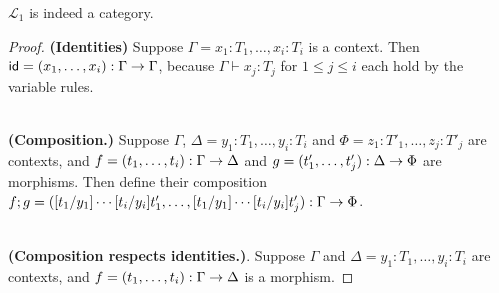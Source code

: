 \begin{lemma}
  \label{lemma:class-stlc}
  $\mathcal{L}_1$ is indeed a category.
\end{lemma}
\begin{proof}
  \textbf{(Identities)} Suppose $\Gamma = x_1:T_1,\ldots,x_i:T_i$ is a
  context.  Then $\mathsf{id} = (x_1,\ldots,x_i) : \Gamma \rightarrow
  \Gamma$, because $\Gamma \vdash x_j : T_j$ for $1 \leq j \leq i$
  each hold by the variable rules.

  \ \\ \textbf{(Composition.)}  Suppose $\Gamma$, $\Delta =
  y_1:T_1,\ldots,y_i:T_i$ and $\Phi = z_1:T'_1,\ldots,z_j:T'_j$ are
  contexts, and $f = (t_1,\ldots,t_i) : \Gamma \rightarrow \Delta$ and $g =
  (t'_1,\ldots,t'_j) : \Delta \rightarrow \Phi$ are morphisms.  Then define
  their composition $f;g =
  ([t_1/y_1]\cdots[t_i/y_i]t'_1,\ldots,[t_1/y_1]\cdots[t_i/y_i]t'_j):
  \Gamma \rightarrow \Phi$.

  \ \\ \textbf{(Composition respects identities.)}. Suppose $\Gamma$
  and $\Delta = y_1:T_1,\ldots,y_i:T_i$ are contexts, and $f =
  (t_1,\ldots,t_i) : \Gamma \rightarrow \Delta$ is a morphism.
\end{proof}
